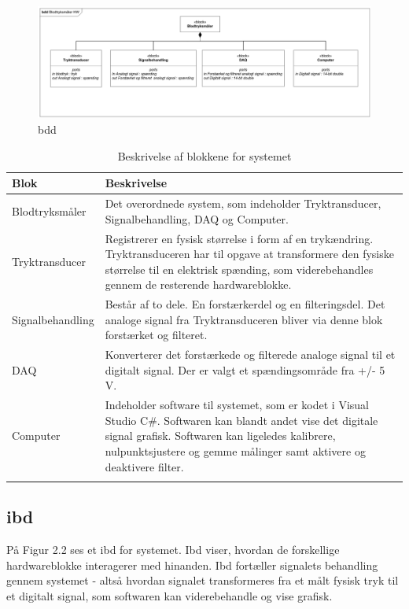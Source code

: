 \begin{figure}[H]
	\centering
	\includegraphics[width=1\textwidth]{Figurer/Snip20151209_70}
	\caption{bdd}
	\label{fig:bdd}
\end{figure}

\begin{longtabu} to 
	\textbf{Blok} &	\textbf{Beskrivelse} \\[-1ex]
	\midrule
	Blodtryksmåler & Det overordnede system, som indeholder Tryktransducer, Signalbehandling, DAQ og Computer.\\[-1ex]
	Tryktransducer & Registrerer en fysisk størrelse i form af en trykændring. Tryktransduceren har til opgave at transformere den fysiske størrelse til en elektrisk spænding, som viderebehandles gennem de resterende hardwareblokke.  \\[-1ex]
	Signalbehandling & Består af to dele. En forstærkerdel og en filteringsdel. Det analoge signal fra Tryktransduceren bliver via denne blok forstærket og filteret.\\[-1ex]
	DAQ & Konverterer det forstærkede og filterede analoge signal til et digitalt signal. Der er valgt et spændingsområde fra +/- 5 V.\\[-1ex]
	Computer & Indeholder software til systemet, som er kodet i Visual Studio C\#. Softwaren kan blandt andet vise det digitale signal grafisk. Softwaren kan ligeledes kalibrere, nulpunktsjustere og gemme målinger samt aktivere og deaktivere filter.\\[-1ex]
	\caption{Beskrivelse af blokkene for systemet}
	\end{longtabu}
	
\subsection{ibd}
På Figur 2.2 ses et ibd for systemet. Ibd viser, hvordan de forskellige hardwareblokke interagerer med hinanden. Ibd fortæller signalets behandling gennem systemet - altså hvordan signalet transformeres fra et målt fysisk tryk til et digitalt signal, som softwaren kan viderebehandle og vise grafisk. 


